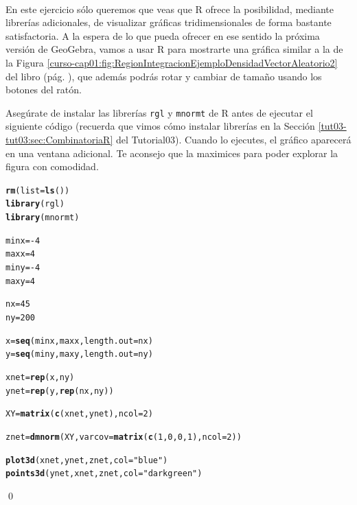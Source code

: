 \documentclass[10pt,a4paper]{article}\usepackage[]{graphicx}\usepackage[]{color}
\makeatletter
\newcommand{\hlnum}[1]{\textcolor[rgb]{0.686,0.059,0.569}{#1}}%
\newcommand{\hlstr}[1]{\textcolor[rgb]{0.192,0.494,0.8}{#1}}%
\newcommand{\hlopt}[1]{\textcolor[rgb]{0,0,0}{#1}}%
\newcommand{\hlstd}[1]{\textcolor[rgb]{0.345,0.345,0.345}{#1}}%
\newcommand{\hlkwb}[1]{\textcolor[rgb]{0.69,0.353,0.396}{#1}}%
\newcommand{\hlkwc}[1]{\textcolor[rgb]{0.333,0.667,0.333}{#1}}%
\newcommand{\hlkwd}[1]{\textcolor[rgb]{0.737,0.353,0.396}{\textbf{#1}}}%
\newenvironment{kframe}{%
 \def\at@end@of@kframe{}%
 \ifinner\ifhmode%
  \def\at@end@of@kframe{\end{minipage}}%
  \begin{minipage}{\columnwidth}%
 \fi\fi%
 \def\FrameCommand##1{\hskip\@totalleftmargin \hskip-\fboxsep
 \colorbox{shadecolor}{##1}\hskip-\fboxsep
     \hskip-\linewidth \hskip-\@totalleftmargin \hskip\columnwidth}%
 \MakeFramed {\advance\hsize-\width
   \@totalleftmargin\z@ \linewidth\hsize
   \@setminipage}}%
 {\par\unskip\endMakeFramed%
 \at@end@of@kframe}
\newenvironment{knitrout}{}{} %
\makeatother
\begin{document}
\begin{ejercicio}
\label{tut05:ejercicio58}
\quad\\
En este ejercicio sólo queremos que veas que R ofrece la posibilidad, mediante librerías adicionales, de visualizar gráficas tridimensionales de forma bastante satisfactoria. A la espera de lo que pueda ofrecer en ese sentido la próxima versión de GeoGebra, vamos a usar R para mostrarte una gráfica similar a la de la Figura \ref{curso-cap01:fig:RegionIntegracionEjemploDensidadVectorAleatorio2} del libro (pág. \pageref{curso-cap01:fig:RegionIntegracionEjemploDensidadVectorAleatorio2}), que además podrás rotar y cambiar de tamaño usando los botones del ratón.

Asegúrate de instalar las librerías {\tt rgl} y {\tt mnormt} de R antes de ejecutar el siguiente código (recuerda que vimos cómo instalar librerías en la Sección \ref{tut03-tut03:sec:CombinatoriaR} del Tutorial03). Cuando lo ejecutes, el gráfico aparecerá en una ventana adicional. Te aconsejo que la maximices para poder explorar la figura con comodidad.
\begin{knitrout}
\color{fgcolor}\begin{kframe}
\begin{alltt}
\hlkwd{rm}\hlstd{(}\hlkwc{list}\hlstd{=}\hlkwd{ls}\hlstd{())}
\hlkwd{library}\hlstd{(rgl)}
\hlkwd{library}\hlstd{(mnormt)}

\hlstd{minx} \hlkwb{=} \hlopt{-}\hlnum{4}
\hlstd{maxx} \hlkwb{=} \hlnum{4}
\hlstd{miny} \hlkwb{=} \hlopt{-}\hlnum{4}
\hlstd{maxy} \hlkwb{=} \hlnum{4}

\hlstd{nx} \hlkwb{=} \hlnum{45}
\hlstd{ny} \hlkwb{=} \hlnum{200}

\hlstd{x}\hlkwb{=} \hlkwd{seq}\hlstd{(minx, maxx,} \hlkwc{length.out} \hlstd{= nx)}
\hlstd{y}\hlkwb{=} \hlkwd{seq}\hlstd{(miny, maxy,} \hlkwc{length.out} \hlstd{= ny)}

\hlstd{xnet} \hlkwb{=} \hlkwd{rep}\hlstd{(x, ny)}
\hlstd{ynet} \hlkwb{=} \hlkwd{rep}\hlstd{(y,} \hlkwd{rep}\hlstd{(nx,ny))}

\hlstd{XY} \hlkwb{=} \hlkwd{matrix}\hlstd{(}\hlkwd{c}\hlstd{(xnet, ynet),} \hlkwc{ncol} \hlstd{=} \hlnum{2}\hlstd{)}

\hlstd{znet} \hlkwb{=} \hlkwd{dmnorm}\hlstd{(XY,} \hlkwc{varcov} \hlstd{=} \hlkwd{matrix}\hlstd{(}\hlkwd{c}\hlstd{(}\hlnum{1}\hlstd{,}\hlnum{0}\hlstd{,}\hlnum{0}\hlstd{,}\hlnum{1}\hlstd{),} \hlkwc{ncol} \hlstd{=} \hlnum{2}\hlstd{))}

\hlkwd{plot3d}\hlstd{(xnet, ynet, znet,} \hlkwc{col}\hlstd{=}\hlstr{"blue"}\hlstd{)}
\hlkwd{points3d}\hlstd{(ynet, xnet, znet,} \hlkwc{col}\hlstd{=}\hlstr{"darkgreen"}\hlstd{)}
\end{alltt}
\end{kframe}
\end{knitrout}


\qed
\end{ejercicio}
\end{document}
